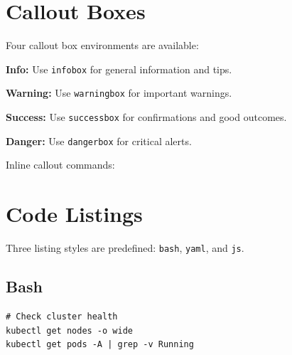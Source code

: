 \documentclass[11pt,a4paper]{article}
\begin{document}
\section{Callout Boxes}

Four callout box environments are available:

\begin{infobox}
\textbf{Info:} Use \texttt{infobox} for general information and tips.
\end{infobox}

\begin{warningbox}
\textbf{Warning:} Use \texttt{warningbox} for important warnings.
\end{warningbox}

\begin{successbox}
\textbf{Success:} Use \texttt{successbox} for confirmations and good outcomes.
\end{successbox}

\begin{dangerbox}
\textbf{Danger:} Use \texttt{dangerbox} for critical alerts.
\end{dangerbox}

Inline callout commands:



\section{Code Listings}

Three listing styles are predefined: \texttt{bash}, \texttt{yaml}, and \texttt{js}.

\subsection{Bash}

\begin{lstlisting}[style=bash]
# Check cluster health
kubectl get nodes -o wide
kubectl get pods -A | grep -v Running
\end{lstlisting}
\end{document}
